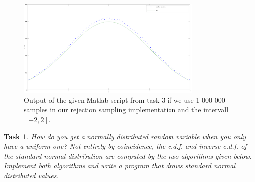 \documentclass{scrartcl}
\newtheorem{task}{Task}
\begin{document}
	\begin{figure}[h]
		\centering
		\includegraphics[width=0.8\textwidth]{rejection_sampling_too_small_intervall}
		\caption{Output of the given Matlab script from task 3 if we use 1 000 000 samples in our rejection sampling implementation and the intervall $[-2,2]$.}
		\label{fig_rejection_samp_wrong}
	\end{figure} 
	
	\begin{task}
		How do you get a normally distributed random variable when you only have a uniform
		one? Not entirely by coincidence, the c.d.f. and inverse c.d.f. of the standard normal distribution
		are computed by the two algorithms given below. Implement both algorithms and write a program
		that draws standard normal distributed values.
	\end{task}
\end{document}
